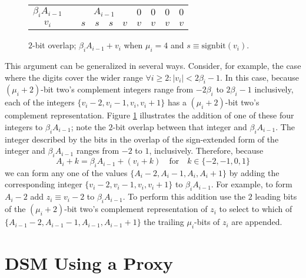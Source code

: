 \documentclass[10pt]{article}
\theoremstyle{definition}
\theoremstyle{remark}
\numberwithin{equation}{section}
\newcommand{\abs}[1]{\lvert #1 \rvert}
\begin{document}
\begin{figure}[t]
	\centering
	\begin{tabular}{crcccc|llll}
		\cmidrule{3-10}    $\beta_i A_{i-1}$ &       & \multicolumn{4}{c|}{$A_{i-1}$} & $0$     & $0$     & $0$     & \multicolumn{1}{c|}{$0$}  \\
		\cmidrule{3-10}    $v_i$ &       &
		\multicolumn{1}{c}{$s$} & \multicolumn{1}{c|}{$s$} &  \multicolumn{1}{c}{$s$} & \multicolumn{1}{c}{$v$} & $v$     & $v$     & $v$     & \multicolumn{1}{c|}{$v$} \\ 
		\cmidrule{3-10}    
	\end{tabular}%
	\caption{$2$-bit overlap; $\beta_i A_{i-1} + v_i$ when $\mu_i = 4$ and $s \equiv \text{signbit}(v_i)$.\label{fig:overlap_2b}}
\end{figure}

This argument can be generalized in several ways. 
Consider, for example, the case where the digits cover the wider range $\forall i \ge 2: \abs{v_i} < 2\beta_i-1$. 
In this case, because $(\mu_i+2)$-bit two's complement integers range from $-2\beta_i$ to $2\beta_i-1$ inclusively, each of the integers $\{v_i-2,v_i-1,v_i,v_i+1\}$ has a $(\mu_i+2)$-bit two's complement representation.
Figure \ref{fig:overlap_2b} illustrates the addition of one of these four integers to $\beta_i A_{i-1}$; note the $2$-bit overlap between that integer and $\beta_i A_{i-1}$. 
The integer described by the bits in the overlap of the sign-extended form of the integer and $\beta_i A_{i-1}$ ranges from $-2$ to $1$, inclusively. 
Therefore, because
\[
A_i + k = \beta_i A_{i-1} + (v_i + k) \quad\text{for}\quad k \in \{-2,-1,0,1\}
\] 
we can form any one of the values $\{A_i-2,A_i-1,A_i,A_i+1\}$ by adding the corresponding integer
$\{v_i-2,v_i-1,v_i,v_i+1\}$ to $\beta_i A_{i-1}$.
For example, to form $A_i-2$ add $z_i \equiv v_i-2$ to $\beta_i A_{i-1}$. To perform this addition use the $2$ leading bits of the $(\mu_i+2)$-bit two's complement representation of $z_i$ to select to which of $\{A_{i-1}-2, A_{i-1}-1, A_{i-1}, A_{i-1}+1\}$ the trailing $\mu_i$-bits of $z_i$ are appended.

\section{DSM Using a Proxy\label{sec:dsm_proxy}}
\end{document}

